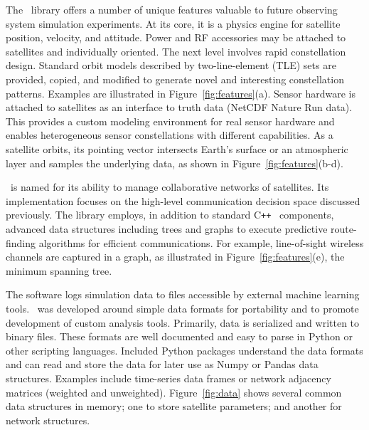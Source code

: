 \documentclass[conference]{IEEEtran}
\newcommand{\project}{{\sc{Collaborate}}~}
\newcommand{\cpp}{C\texttt{++}~}
\begin{document}
The \project library offers a number of unique features valuable to future
observing system simulation experiments.  At its core, it is a physics engine
for satellite position, velocity, and attitude.  Power and RF accessories may be
attached to satellites and individually oriented.  The next level involves rapid
constellation design.  Standard orbit models described by two-line-element (TLE)
sets are provided, copied, and modified to generate novel and interesting
constellation patterns.  Examples are illustrated in
Figure~\ref{fig:features}(a).  Sensor hardware is attached to satellites as an
interface to truth data (NetCDF Nature Run data).  This provides a custom
modeling environment for real sensor hardware and enables heterogeneous sensor
constellations with different capabilities.  As a satellite orbits, its pointing
vector intersects Earth's surface or an atmospheric layer and samples the
underlying data, as shown in Figure~\ref{fig:features}(b-d).

\project is named for its ability to manage collaborative networks of
satellites.  Its implementation focuses on the high-level communication decision
space discussed previously.  The library employs, in addition to standard \cpp
components, advanced data structures including trees and graphs to execute
predictive route-finding algorithms for efficient communications.  For example,
line-of-sight wireless channels are captured in a graph, as illustrated in
Figure~\ref{fig:features}(e), the minimum spanning tree.

The software logs simulation data to files accessible by external machine
learning tools.  \project was developed around simple data formats for
portability and to promote development of custom analysis tools.  Primarily,
data is serialized and written to binary files.  These formats are well
documented and easy to parse in Python or other scripting languages.  Included
Python packages understand the data formats and can read and store the data for
later use as Numpy or Pandas data structures.  Examples include time-series data
frames or network adjacency matrices (weighted and unweighted).
Figure~\ref{fig:data} shows several common data structures in memory; one to
store satellite parameters; and another for network structures.
\end{document}
